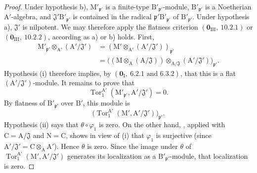 \begin{proof}
Under hypothesis b), $\mathrm{M}'_{\mathfrak{p}'}$ is a finite-type
$\mathrm{B}'_{\mathfrak{p}'}$-module,
$\mathrm{B}'_{\mathfrak{p}'}$ is a Noetherian
$\mathrm{A}'$-algebra, and
$\mathfrak{J}'\mathrm{B}'_{\mathfrak{p}'}$ is contained in the radical
$\mathfrak{p}'\mathrm{B}'_{\mathfrak{p}'}$ of
$\mathrm{B}'_{\mathfrak{p}'}$. Under hypothesis a),
$\mathfrak{J}'$ is nilpotent. We may therefore apply the flatness
criterion $(\mathbf{0}_{\mathrm{III}},~10.2.1)$ or
$(\mathbf{0}_{\mathrm{III}},~10.2.2)$, according as a) or b) holds.
First,
\[
\begin{split}
  \mathrm{M}'_{\mathfrak{p}'}\otimes_{\mathrm{A}'}
    (\mathrm{A}'/\mathfrak{J}')
  &=(\mathrm{M}'\otimes_{\mathrm{A}'}
    (\mathrm{A}'/\mathfrak{J}'))_{\mathfrak{p}'}\\
  &=\bigl((\mathrm{M}\otimes_\mathrm{A}
    (\mathrm{A}/\mathfrak{J}))
    \otimes_{\mathrm{A}/\mathfrak{J}}
    (\mathrm{A}'/\mathfrak{J}')\bigr)_{\mathfrak{p}'}.
\end{split}
\]
Hypothesis (i) therefore implies, by
$(\mathbf{0}_\mathrm{I},~6.2.1\text{ and }6.3.2)$, that this is a flat
$(\mathrm{A}'/\mathfrak{J}')$-module. It remains to prove that
\[
  \operatorname{Tor}_1^{\mathrm{A}'}
  (\mathrm{M}'_{\mathfrak{p}'},\mathrm{A}'/\mathfrak{J}')=0.
\]
By flatness of $\mathrm{B}'_{\mathfrak{p}'}$ over $\mathrm{B}'$, this
module is
\[
  \bigl(\operatorname{Tor}_1^{\mathrm{A}'}
  (\mathrm{M}',\mathrm{A}'/\mathfrak{J}')\bigr)_{\mathfrak{p}'}.
\]
Hypothesis (ii) says that $\theta\circ\varphi_1$ is zero. On the other
hand, , applied with
$\mathrm{C}=\mathrm{A}/\mathfrak{J}$ and $\mathrm{N}=\mathrm{C}$,
shows in view of (i) that $\varphi_1$ is surjective
(since $\mathrm{A}'/\mathfrak{J}'=\mathrm{C}\otimes_\mathrm{A}
\mathrm{A}'$). Hence $\theta$ is zero. Since the image under $\theta$
of $\operatorname{Tor}_1^{\mathrm{A}'}
(\mathrm{M}',\mathrm{A}'/\mathfrak{J}')$ generates its localization as
a $\mathrm{B}'_{\mathfrak{p}'}$-module, that localization is zero.
\end{proof}

